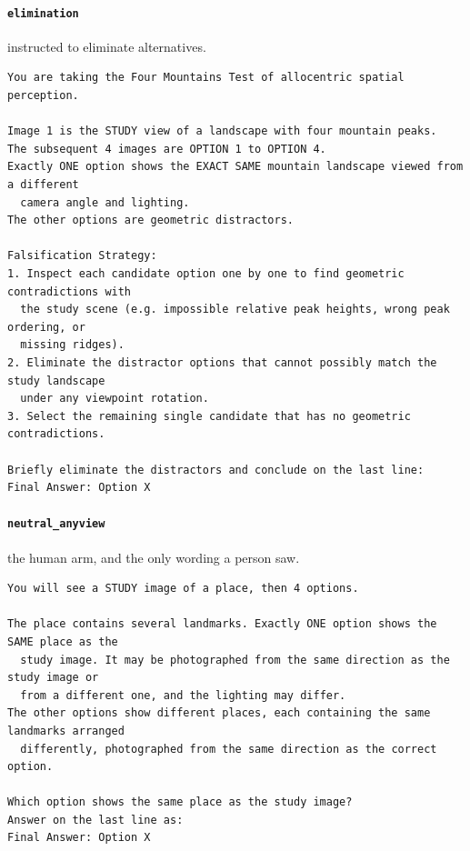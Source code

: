 \paragraph{\texttt{elimination}} instructed to eliminate alternatives.

\begin{footnotesize}
\begin{verbatim}
You are taking the Four Mountains Test of allocentric spatial perception.

Image 1 is the STUDY view of a landscape with four mountain peaks.
The subsequent 4 images are OPTION 1 to OPTION 4.
Exactly ONE option shows the EXACT SAME mountain landscape viewed from a different
  camera angle and lighting.
The other options are geometric distractors.

Falsification Strategy:
1. Inspect each candidate option one by one to find geometric contradictions with
  the study scene (e.g. impossible relative peak heights, wrong peak ordering, or
  missing ridges).
2. Eliminate the distractor options that cannot possibly match the study landscape
  under any viewpoint rotation.
3. Select the remaining single candidate that has no geometric contradictions.

Briefly eliminate the distractors and conclude on the last line:
Final Answer: Option X
\end{verbatim}
\end{footnotesize}

\paragraph{\texttt{neutral\_anyview}} the human arm, and the only wording a person saw.

\begin{footnotesize}
\begin{verbatim}
You will see a STUDY image of a place, then 4 options.

The place contains several landmarks. Exactly ONE option shows the SAME place as the
  study image. It may be photographed from the same direction as the study image or
  from a different one, and the lighting may differ.
The other options show different places, each containing the same landmarks arranged
  differently, photographed from the same direction as the correct option.

Which option shows the same place as the study image?
Answer on the last line as:
Final Answer: Option X
\end{verbatim}
\end{footnotesize}

